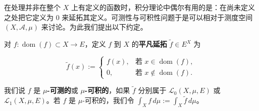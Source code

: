 在处理并非在整个 $ X $ 上有定义的函数时，积分理论中偶尔有用的是：在尚未定义之处把它定义为 0 来延拓其定义。可测性与可积性问题于是可以相对于测度空间 $ (X,\mathcal{A},\mu) $ 来讨论。为此我们提出以下约定。

对 $ f: \operatorname{dom}(f) \subset X \to E $，定义 $ f $ 到 $ X $ 的\textbf{平凡延拓} $ \tilde{f} \in E^X $ 为

\begin{equation*}
\tilde{f}(x) := \begin{cases} f(x), & \text{若 } x \in \operatorname{dom}(f), \\ 0, & \text{若 } x \notin \operatorname{dom}(f). \end{cases}
\end{equation*}

我们说 $ f $ 是 \textbf{$ \mu $-可测的}或 \textbf{$ \mu $-可积的}，如果 $ \tilde{f} $ 分别属于 $ \mathcal{L}_0(X,\mu,E) $ 或 $ \mathcal{L}_1(X,\mu,E) $。若 $ f $ 是 $ \mu $-可积的，我们令 $ \int_X f \, d\mu := \int_X \tilde{f} \, d\mu $。

